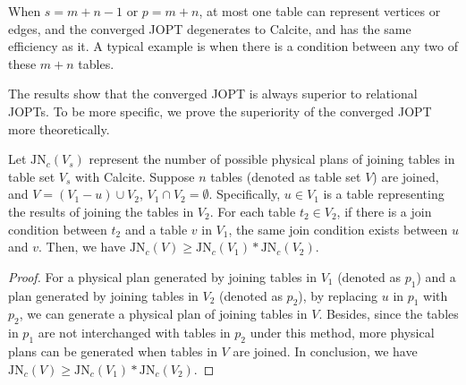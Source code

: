 When $s = m + n - 1$ or $p = m + n$, at most one table can represent vertices or edges, and the converged JOPT degenerates to Calcite, and has the same efficiency as it.
A typical example is when there is a condition between any two of these $m + n$ tables.

The results show that the converged JOPT is always superior to relational JOPTs.
To be more specific, we prove the superiority of the converged JOPT more theoretically.
\fi

\begin{lemma}
    \label{lemma:join-spliter}
    Let $\text{JN}_c(V_s)$ represent the number of possible physical plans of joining tables in table set $V_s$ with Calcite.
    Suppose $n$ tables (denoted as table set $V$) are joined, and $V = (V_1 - u) \cup V_2$, $V_1 \cap V_2 = \emptyset$.
    Specifically, $u \in V_1$ is a table representing the results of joining the tables in $V_2$.
    For each table $t_2 \in V_2$, if there is a join condition between $t_2$ and a table $v$ in $V_1$, the same join condition exists between $u$ and $v$.
    Then, we have $\text{JN}_c(V) \geq \text{JN}_c(V_1) * \text{JN}_c(V_2)$.
\end{lemma}
\begin{proof}
    For a physical plan generated by joining tables in $V_1$ (denoted as $p_1$) and a plan generated by joining tables in $V_2$ (denoted as $p_2$), by replacing $u$ in $p_1$ with $p_2$, we can generate a physical plan of joining tables in $V$.
    Besides, since the tables in $p_1$ are not interchanged with tables in $p_2$ under this method, more physical plans can be generated when tables in $V$ are joined.
    In conclusion, we have $\text{JN}_c(V) \geq \text{JN}_c(V_1) * \text{JN}_c(V_2)$.
\end{proof}

